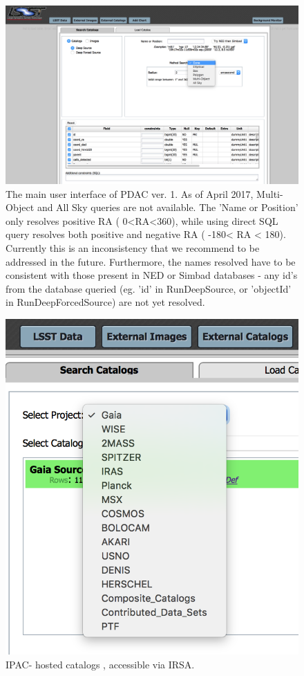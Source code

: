 \documentclass[DM,lsstdraft,toc]{lsstdoc}
\begin{document}
\begin{figure}
\includegraphics[width=\textwidth]{figs/1_PDAC_interface}
\caption{The main user interface of PDAC ver. 1. As of April 2017, Multi-Object and All Sky queries are not available. The 'Name or Position' only resolves positive RA  (  0\degree<RA<360\degree ), while using direct SQL query resolves both positive and negative RA ( -180\degree < RA < 180\degree ). Currently this is an inconsistency that we recommend to be addressed in the future. Furthermore, the names resolved have to be consistent with those present in NED or  Simbad databases - any id's from the database queried (eg. 'id' in RunDeepSource, or  'objectId' in RunDeepForcedSource) are not yet resolved.}
\label{fig:PDAC_interface}
\end{figure}

\begin{figure}
\begin{centering}
\includegraphics[width=0.5\columnwidth]{figs/2_PDAC_externals}
\caption{IPAC- hosted catalogs , accessible via IRSA. }
\label{fig:PDAC_external_cat}
\end{centering}
\end{figure}
\end{document}
